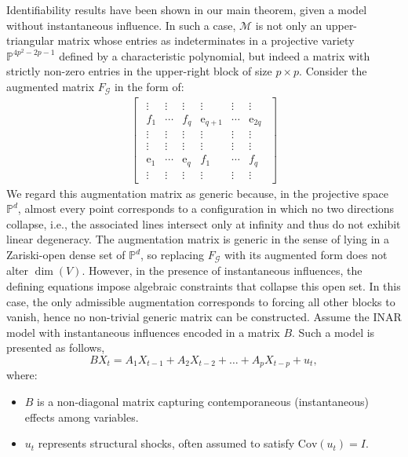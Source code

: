 \documentclass[10pt]{article}
\numberwithin{figure}{section}
\begin{document}
Identifiability results have been shown in our main theorem, given a model without instantaneous influence. In such a case, $\mathcal{M}$ is not only an upper-triangular matrix whose entries as indeterminates in a projective variety  $\mathbb{P}^{4p^2-2p-1}$ defined by a characteristic polynomial, but indeed a matrix with strictly non-zero entries in the upper-right block of size $p\times p$. Consider the augmented matrix $F_{\mathscr{G}}$ in the form of:
\begin{align*}
    \begin{bmatrix}
    \begin{array}{ccc|ccc}
            \vdots & \vdots & \vdots & \vdots & \vdots & \vdots \\
            f_1  & \cdots &  f_q &\mathrm{e}_{q+1} &  \cdots & \mathrm{e}_{2q}\\
             \vdots & \vdots & \vdots & \vdots & \vdots & \vdots \\ \hline
             \vdots & \vdots  & \vdots & \vdots & \vdots& \vdots \\
             \mathrm{e}_{1} &  \cdots & \mathrm{e}_{q} & f_1  & \cdots &  f_q\\
              \vdots & \vdots  & \vdots & \vdots & \vdots& \vdots
    \end{array}
    \end{bmatrix}
\end{align*}
We regard this augmentation matrix as generic because, in the projective space $\mathbb{P}^d$, almost every point corresponds to a configuration in which no two directions collapse, i.e., the associated lines intersect only at infinity and thus do not exhibit linear degeneracy. The augmentation matrix is generic in the sense of lying in a Zariski-open dense set of $\mathbb{P}^d$, so replacing $F_{\mathscr{G}}$ with its augmented form does not alter $\dim(V)$. However, in the presence of instantaneous influences, the defining equations impose algebraic constraints that collapse this open set. In this case, the only admissible augmentation corresponds to forcing all other blocks to vanish, hence no non-trivial generic matrix can be constructed. Assume the INAR model with instantaneous influences encoded in a matrix $B$. Such a model is presented as follows,
\begin{equation}
B X_t = A_1 X_{t-1} + A_2 X_{t-2} + \dots + A_p X_{t-p} + u_t,
\end{equation}
where:
\begin{itemize}
    \item[] $B$ is a non-diagonal matrix capturing contemporaneous (instantaneous) effects among variables.
    \item[] $u_t$ represents structural shocks, often assumed to satisfy $\mathrm{Cov}(u_t) = I$.
\end{itemize}
\end{document}
